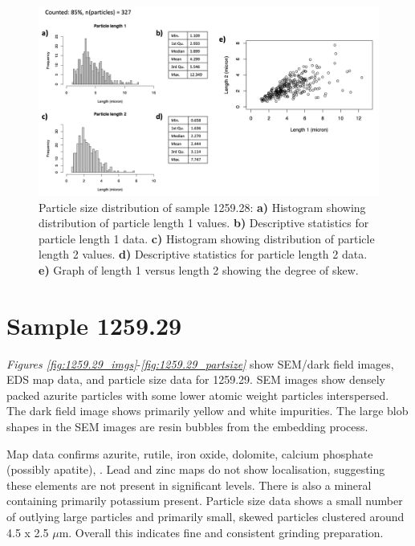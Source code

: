 \begin{figure}[H]
\centering
  \includegraphics[width=\linewidth]{1259-28_partsize}
\caption[Particle size distribution, sample 1259.28.]{Particle size distribution of sample 1259.28: \textbf{a)} Histogram showing distribution of particle length 1 values. \textbf{b)} Descriptive statistics for particle length 1 data. \textbf{c)} Histogram showing distribution of particle length 2 values. \textbf{d)} Descriptive statistics for particle length 2 data. \textbf{e)} Graph of length 1 versus length 2 showing the degree of skew.}
\label{fig:1259.28_partsize}
\end{figure}


\section{Sample 1259.29}

\textit{Figures \ref{fig:1259.29_imgs}}-\textit{\ref{fig:1259.29_partsize}} show SEM/dark field images, EDS map data, and particle size data for 1259.29. SEM images show densely packed azurite particles with some lower atomic weight particles interspersed. The dark field image shows primarily yellow and white impurities. The large blob shapes in the SEM images are resin bubbles from the embedding process.

Map data confirms azurite, rutile, iron oxide, dolomite, calcium phosphate (possibly apatite), . Lead and zinc maps do not show localisation, suggesting these elements are not present in significant levels. There is also a mineral containing primarily potassium present. Particle size data shows a small number of outlying large particles and primarily small, skewed particles clustered around 4.5 x 2.5 $\mu$m. Overall this indicates fine and consistent grinding preparation. 

